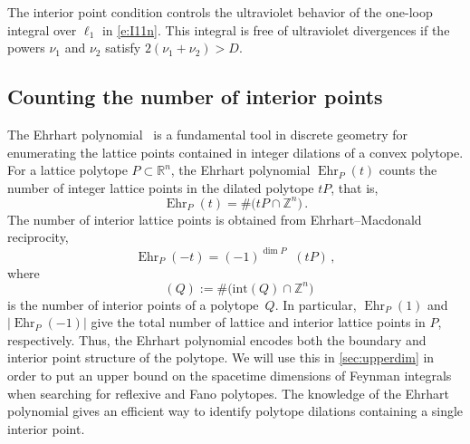 \documentclass[12pt,a4paper]{article}
\theoremstyle{plain}
\theoremstyle{remark}
\DeclareMathOperator{\nint}{N_{\mathrm{int}}}
\DeclareMathOperator{\ehr}{Ehr}
\begin{document}
        The interior point condition controls the ultraviolet behavior of the  one-loop integral over $\ell_1$ in \cref{e:I11n}. This integral is free of ultraviolet divergences  if the powers $\nu_1$ and $\nu_2$  satisfy $2(\nu_1+\nu_2)>D$.
                      

                 \subsection{Counting the number of interior points}\label{sec:NBinterior}

                 The Ehrhart polynomial~\cite{Haase:2012,Beck:2015} is a fundamental tool in discrete geometry for enumerating the
lattice points contained in integer dilations of a convex polytope. 
For a lattice polytope \( P \subset \mathbb{R}^n \), the Ehrhart polynomial \( \ehr_P(t) \)
counts the number of integer lattice points in the dilated polytope \( tP \), that is,
\begin{equation}
\ehr_P(t) = \# \big( tP \cap \mathbb{Z}^n \big)\, .
\end{equation}
The number of interior lattice points is obtained from Ehrhart--Macdonald reciprocity,
\begin{equation}
\label{eq:n_int_ehr}
 \ehr_P(-t) = (-1)^{\dim P} \nint(tP) \, ,
\end{equation}
where
\begin{equation}
\nint(Q) := \# \big( \mathrm{int}(Q) \cap \mathbb{Z}^n \big)
\end{equation}
is the number of interior points of a polytope~$Q$.
In particular, \( \ehr_P(1) \) and \(\lvert \ehr_P(-1) \rvert\) give the total number of lattice and interior lattice points in \( P \), respectively.
Thus, the Ehrhart polynomial encodes both the boundary and interior
point structure of the polytope. We will use this in \cref{sec:upperdim} in order to put an upper 
bound on the spacetime dimensions of Feynman integrals when searching for reflexive and Fano polytopes. The knowledge of the Ehrhart polynomial gives an efficient way to identify polytope dilations containing a single interior point.

\medskip
\end{document}
